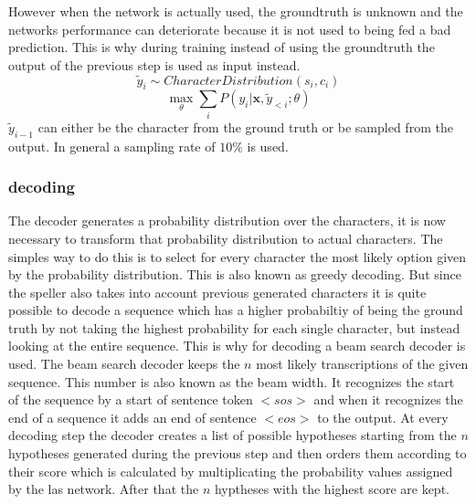 \documentclass[a4paper]{article}
\begin{document}
However when the network is actually used, the groundtruth is unknown and the networks performance can deteriorate because it is not used to being fed a bad prediction. This is why during training instead of using the groundtruth the output of the previous step is used as input instead.
\begin{equation}
\tilde{y}_i \sim CharacterDistribution(s_i,c_i)
\end{equation}
\begin{equation}
\max\limits_\theta \sum\limits_i P(y_i|\bm{x},\tilde{y}_{<i};\theta)
\end{equation}
$\tilde{y}_{i-1}$ can either be the character from the ground truth or be sampled from the output. In general a sampling rate of $10\%$ is used.
\subsubsection{decoding}
The decoder generates a probability distribution over the characters, it is now necessary to transform that probability distribution to actual characters. The simples way to do this is to select for every character the most likely option given by the probability distribution. This is also known as greedy decoding. But since the speller also takes into account previous generated characters it is quite possible to decode a sequence which has a higher probabiltiy of being the ground truth by not taking the highest probability for each single character, but instead looking at the entire sequence. This is why for decoding a beam search decoder is used.
The beam search decoder keeps the $n$ most likely transcriptions of the given sequence. This number is also known as the beam width. It recognizes the start of the sequence by a start of sentence token $<sos>$ and when it recognizes the end of a sequence it adds an end of sentence $<eos>$ to the output. At every decoding step the decoder creates a list of possible hypotheses starting from the $n$ hypotheses generated during the previous step and then orders them according to their score which is calculated by multiplicating the probability values assigned by the las network. After that the $n$ hyptheses with the highest score are kept.
\end{document}
